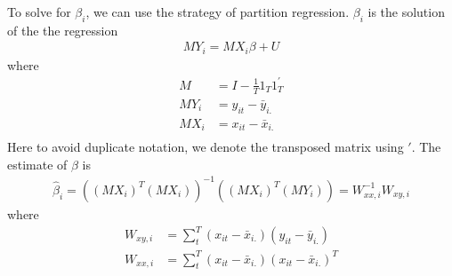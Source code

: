 \documentclass[a4paper]{article}
\begin{document}
To solve for $\beta_i$, we can use the strategy of partition regression. $\beta_i$ is the solution of the the regression
\begin{align*}
MY_i= MX_i\beta + U
\end{align*}
where 
\begin{align*}
M & = I -\frac{1}{T}1_T 1_T^{'} \\
MY_i & = y_{it}-\bar y_{i.} \\
MX_i & = x_{it}-\bar x_{i.} \\
\end{align*}
Here to avoid duplicate notation, we denote the transposed matrix using $'$. The estimate of $\beta$ is
\begin{align*}
\hat \beta_i = ((MX_i)^T(MX_i))^{-1}((MX_i)^T(MY_i))=  W_{xx,i}^{-1}W_{xy,i}
\end{align*}
where 
\begin{align*}
W_{xy,i} &= \sum_t^T(x_{it}-\bar x_{i.})(y_{it}-\bar y_{i.}) \\
W_{xx,i} &= \sum_t^T(x_{it}-\bar x_{i.})(x_{it}-\bar x_{i.})^T
\end{align*}
\end{document}

